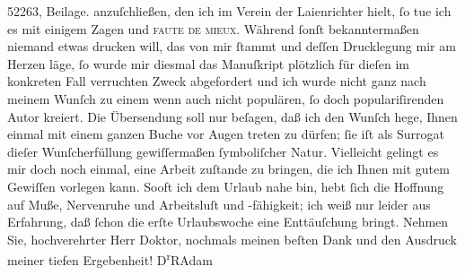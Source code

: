 \begin{ledgroupsized}[t]{13cm}
{{{                            52263, Beilage.}}}\label{K_L02514_1h} anzuſchließen, den ich im Verein der Laienrichter hielt, ſo tue ich es mit einigem
                    Zagen und \textsc{faute de mieux}. Während ſonſt bekanntermaßen
                    niemand etwas drucken will, das von mir ſtammt und deſſen Drucklegung mir am
                    Herzen läge, ſo wurde mir diesmal das Manuſkript plötzlich für dieſen im
                    konkreten Fall verruchten Zweck abgefordert und ich wurde nicht ganz nach meinem
                    Wunſch zu einem wenn auch nicht populären, ſo doch populariſirenden Autor
                    kreiert. Die Übersendung soll nur beſagen, daß ich den Wunſch hege, Ihnen einmal
                    mit einem ganzen Buche {\pb}vor Augen
                    treten zu dürfen; ſie iſt als Surrogat dieſer Wunſcherfüllung gewiſſermaßen
                    ſymboliſcher Natur.\pend
           \pstart
           Vielleicht gelingt es mir doch noch einmal, eine Arbeit zuſtande zu bringen, die
                    ich Ihnen mit gutem Gewiſſen vorlegen kann. Sooft ich dem Urlaub nahe bin, hebt
                    ſich die Hoffnung auf Muße, Nervenruhe und Arbeitsluſt und -fähigkeit; ich weiß
                    nur leider aus Erfahrung, daß ſchon die erſte Urlaubswoche eine Enttäuſchung
                    bringt.\pend
           \pstart
           Nehmen Sie, hochverehrter Herr Doktor, nochmals meinen beſten Dank und den
                    Ausdruck meiner tiefen Ergebenheit!\pend
           \pstart \spacefill\mbox{D\textsuperscript{r}RAdam}\pend{}\endnumbering{}\end{ledgroupsized}  \newcommand{\dateiname}{L02514}\newcommand{\titel}{Robert Adam an Arthur Schnitzler, 22. 7. 1929}\newcommand{\editorInnen}{Martin Anton Müller und Gerd-Hermann Susen}
      